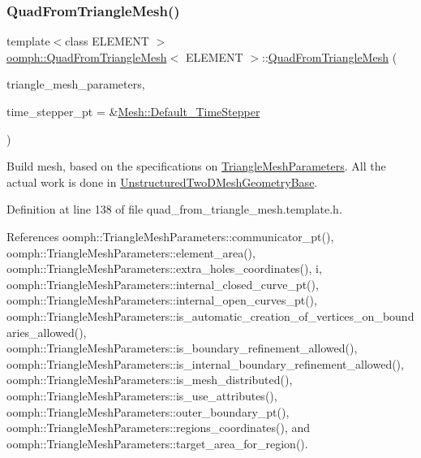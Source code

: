 \subsubsection{\texorpdfstring{Quad\+From\+Triangle\+Mesh()}{QuadFromTriangleMesh()}\hspace{0.1cm}{\footnotesize\ttfamily [3/4]}}
{\footnotesize\ttfamily template$<$class E\+L\+E\+M\+E\+NT $>$ \\
\hyperlink{classoomph_1_1QuadFromTriangleMesh}{oomph\+::\+Quad\+From\+Triangle\+Mesh}$<$ E\+L\+E\+M\+E\+NT $>$\+::\hyperlink{classoomph_1_1QuadFromTriangleMesh}{Quad\+From\+Triangle\+Mesh} (\begin{DoxyParamCaption}\item[{\hyperlink{classoomph_1_1TriangleMeshParameters}{Triangle\+Mesh\+Parameters} \&}]{triangle\+\_\+mesh\+\_\+parameters,  }\item[{\hyperlink{classoomph_1_1TimeStepper}{Time\+Stepper} $\ast$}]{time\+\_\+stepper\+\_\+pt = {\ttfamily \&\hyperlink{classoomph_1_1Mesh_a12243d0fee2b1fcee729ee5a4777ea10}{Mesh\+::\+Default\+\_\+\+Time\+Stepper}} }\end{DoxyParamCaption})\hspace{0.3cm}{\ttfamily [inline]}}



Build mesh, based on the specifications on \hyperlink{classoomph_1_1TriangleMeshParameters}{Triangle\+Mesh\+Parameters}. All the actual work is done in \hyperlink{classoomph_1_1UnstructuredTwoDMeshGeometryBase}{Unstructured\+Two\+D\+Mesh\+Geometry\+Base}. 



Definition at line 138 of file quad\+\_\+from\+\_\+triangle\+\_\+mesh.\+template.\+h.



References oomph\+::\+Triangle\+Mesh\+Parameters\+::communicator\+\_\+pt(), oomph\+::\+Triangle\+Mesh\+Parameters\+::element\+\_\+area(), oomph\+::\+Triangle\+Mesh\+Parameters\+::extra\+\_\+holes\+\_\+coordinates(), i, oomph\+::\+Triangle\+Mesh\+Parameters\+::internal\+\_\+closed\+\_\+curve\+\_\+pt(), oomph\+::\+Triangle\+Mesh\+Parameters\+::internal\+\_\+open\+\_\+curves\+\_\+pt(), oomph\+::\+Triangle\+Mesh\+Parameters\+::is\+\_\+automatic\+\_\+creation\+\_\+of\+\_\+vertices\+\_\+on\+\_\+boundaries\+\_\+allowed(), oomph\+::\+Triangle\+Mesh\+Parameters\+::is\+\_\+boundary\+\_\+refinement\+\_\+allowed(), oomph\+::\+Triangle\+Mesh\+Parameters\+::is\+\_\+internal\+\_\+boundary\+\_\+refinement\+\_\+allowed(), oomph\+::\+Triangle\+Mesh\+Parameters\+::is\+\_\+mesh\+\_\+distributed(), oomph\+::\+Triangle\+Mesh\+Parameters\+::is\+\_\+use\+\_\+attributes(), oomph\+::\+Triangle\+Mesh\+Parameters\+::outer\+\_\+boundary\+\_\+pt(), oomph\+::\+Triangle\+Mesh\+Parameters\+::regions\+\_\+coordinates(), and oomph\+::\+Triangle\+Mesh\+Parameters\+::target\+\_\+area\+\_\+for\+\_\+region().

